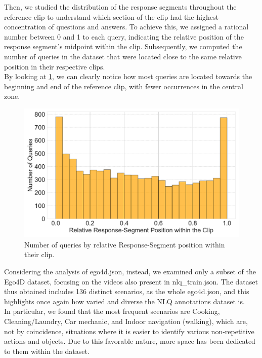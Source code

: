 \documentclass[10pt,twocolumn,letterpaper]{article}
\begin{document}
Then, we studied the distribution of the response segments throughout the reference clip to understand which section of the clip had the highest concentration of questions and answers. To achieve this, we assigned a rational number between 0 and 1 to each query, indicating the relative position of the response segment's midpoint within the clip. Subsequently, we computed the number of queries in the dataset that were located close to the same relative position in their respective clips.\\
By looking at \cref{fig:6}, we can clearly notice how most queries are located towards the beginning and end of the reference clip, with fewer occurrences in the central zone. 

\begin{figure}[t]
    \centering
    \includegraphics[width=1\linewidth]{images/RelativeSegmentPosition_large_font.pdf}
    \caption{Number of queries by relative Response-Segment position within their clip.}
    \label{fig:6}
\end{figure}

Considering the analysis of ego4d.json, instead, we examined only a subset of the Ego4D dataset, focusing on the videos also present in nlq\_train.json. The dataset thus obtained includes 136 distinct scenarios, as the whole ego4d.json, and this highlights once again how varied and diverse the NLQ annotations dataset is.\\
In particular, we found that the most frequent scenarios are Cooking, Cleaning/Laundry, Car mechanic, and Indoor navigation (walking), which are, not by coincidence, situations where it is easier to identify various non-repetitive actions and objects. Due to this favorable nature, more space has been dedicated to them within the dataset.
\end{document}

